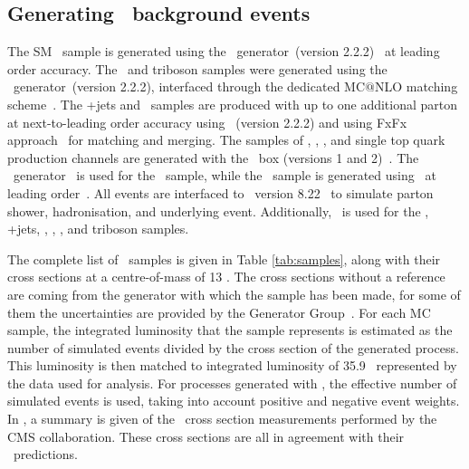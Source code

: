\newpage
\subsection{Generating \SM\  background events}

The SM \tZq\ sample is generated using the \aMCMG\ generator~(version 2.2.2)~\cite{Alwall:1699128} at leading order accuracy. The \ttZ\ and triboson samples were generated using the \\\aMCMG\ generator~(version 2.2.2), interfaced through the dedicated MC${@}$NLO matching scheme~\cite{Frixione:2002ik}. The \WZ+jets and \ttW\ samples are produced with up to one additional parton at next-to-leading order accuracy using \aMCMG~(version 2.2.2) and using FxFx approach~\cite{Frederix:1481985} for matching and merging. The samples of \ttH, \WW, \ZZ,  and single top quark  production channels are generated with the \Powheg\ box (versions 1 and 2)~\cite{Alioli2010,1126-6708-2009-09-111,1126-6708-2007-11-070,Alioli:2010xd,Frixione:2007vw,Nason:2004rx}. The \JHU\ generator~\cite{Gritsan:2016hjl,Anderson:2013afp,Bolognesi:2012mm,Gao:2010qx} is used for the \tqH\ sample, while the \tWZ\ sample is generated using \aMCMG\ at leading order~\cite{Alwall:2011uj}. All events are interfaced to \Pythia~version 8.22~\cite{Sjostrand:2014zea} to simulate parton shower, hadronisation, and underlying event. Additionally, \MS\ is used for the \tZq, \WZ+jets, \ttZ, \ttW, \tWZ, and triboson samples.



The complete list of \SM\ samples is given in Table \ref{tab:samples}, along with their cross sections at a centre-of-mass of 13 \TeV. The cross sections without a reference are coming from the generator with which the sample has been made, for some of them the uncertainties are provided by the Generator Group~\cite{generator}. For each MC sample, the integrated luminosity that the sample represents is estimated as the number of simulated events divided by the cross section of the generated process. This luminosity is then matched to integrated luminosity of 35.9 \fbinv\ represented by the data used for analysis.  For processes generated with \aMCMG, the effective number of simulated events is used, taking into account positive and negative event weights. %
In , a summary is given of the \SM\ cross section measurements performed by the CMS collaboration. These cross sections are all in agreement with their \SM\ predictions. 

